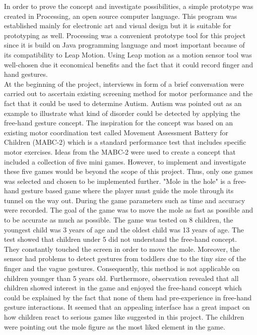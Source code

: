 In order to prove the concept and investigate possibilities, a simple prototype was created in Processing, an open source computer language. This program was established mainly for electronic art and visual design but it is suitable for prototyping as well. Processing was a convenient prototype tool for this project since it is build on Java programming language and most important because of its compatibility to Leap Motion. Using Leap motion as a motion sensor tool was well-chosen due it economical benefits and the fact that it could record finger and hand gestures.\\
At the beginning of the project, interviews in form of a brief conversation were carried out to ascertain existing screening method for motor performance and the fact that it could be used to determine Autism. Autism was pointed out as an example to illustrate what kind of disorder could be detected by applying the free-hand gesture concept. The inspiration for the concept was based on an existing motor coordination test called Movement Assessment Battery for Children (MABC-2) which is a standard performance test that includes specific motor exercises.  
Ideas from the MABC-2 were used to create a concept that included a collection of five mini games. However, to implement and investigate these five games would be beyond the scope of this project. Thus, only one games was selected and chosen to be implemented further. "Mole in the hole" is a free-hand gesture based game where the player must guide the mole through its tunnel on the way out. During the game parameters such as time and accuracy were recorded. The goal of the game was to move the mole as fast as possible and to be accurate as much as possible.
The game was tested on 8 children, the youngest child was 3 years of age and the oldest child was 13 years of age. The test showed that children under 5 did not understand the free-hand concept. They constantly touched the screen in order to move the mole. Moreover, the sensor had problems to detect gestures from toddlers due to the tiny size of the finger and the vague gestures. Consequently, this method is not applicable on children younger than 5 years old. 
Furthermore, observation revealed that all children showed interest in the game and enjoyed the free-hand concept which could be explained by the fact that none of them had pre-experience in free-hand gesture interactions. It seemed that an appealing interface has a great impact on how children react to serious games like suggested in this project. The children were pointing out the mole figure as the most liked element in the game. 

